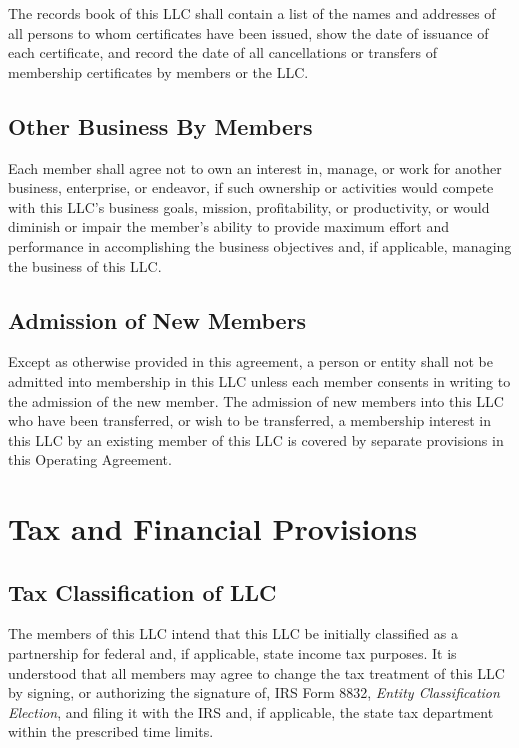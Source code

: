 \documentclass{article}
\begin{document}
			\index The records book of this LLC shall contain a list of the names and addresses of all persons to whom certificates have been issued, show the date of issuance of each certificate, and record the date of all cancellations or transfers of membership certificates by members or the LLC.

			\subsection{Other Business By Members}
			Each member shall agree not to own an interest in, manage, or work for another business, enterprise, or endeavor, if such ownership or activities would compete with this LLC's business goals, mission, profitability, or productivity, or would diminish or impair the member's ability to provide maximum effort and performance in accomplishing the business objectives and, if applicable, managing the business of this LLC.

			\subsection{Admission of New Members}
			Except as otherwise provided in this agreement, a person or entity shall not be admitted into membership in this LLC unless each member consents in writing to the admission of the new member. The admission of new members into this LLC who have been transferred, or wish to be transferred, a membership interest in this LLC by an existing member of this LLC is covered by separate provisions in this Operating Agreement.
		

	\section{Tax and Financial Provisions}

		\subsection{Tax Classification of LLC}
		The members of this LLC intend that this LLC be initially classified as a partnership for federal and, if applicable, state income tax purposes. It is understood that all members may agree to change the tax treatment of this LLC by signing, or authorizing the signature of, IRS Form 8832, \emph{Entity Classification Election}, and filing it with the IRS and, if applicable, the state tax department within the prescribed time limits.
\end{document}
